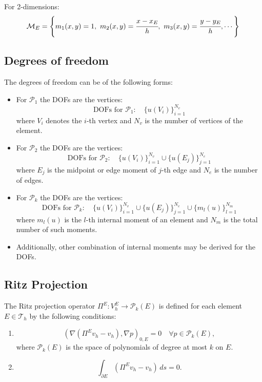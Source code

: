 \documentclass{report}
\begin{document}
For 2-dimensions:
\begin{equation}
    \mathcal{M}_E = \left\{m_1(x,y) = 1,\ m_2(x,y) = \cfrac{x-x_E}{h},\ m_3(x,y) = \cfrac{y-y_E}{h}, \cdots\right\}
\end{equation}



\subsection{Degrees of freedom}
The degrees of freedom can be of the following forms:
\begin{itemize}
    \item For $\mathcal{P}_1$ the DOFs are the vertices:
    $$\text{DOFs for } \mathcal{P}_1: \quad \{ u(V_i) \}_{i=1}^{N_v}$$
    where $V_i$ denotes the $i$-th vertex and $N_v$ is the number of vertices of the element.
    
    \item For $\mathcal{P}_2$ the DOFs are the vertices:
    $$\text{DOFs for } \mathcal{P}_2: \quad \{ u(V_i) \}_{i=1}^{N_v} \cup \{ u(E_j) \}_{j=1}^{N_e}$$
    where $E_j$ is the midpoint or edge moment of $j$-th edge and $N_e$ is the number of edges.
    
    \item For $\mathcal{P}_k$ the DOFs are the vertices:
    $$\text{DOFs for } \mathcal{P}_k: \quad \{ u(V_i) \}_{i=1}^{N_v} \cup \{ u(E_j) \}_{j=1}^{N_e} \cup \{ m_l(u) \}_{l=1}^{N_m}$$
    where $m_l(u)$ is the $l$-th internal moment of an element and $N_m$ is the total number of such moments.

    \item Additionally, other combination of internal moments may be derived for the DOFs.    
\end{itemize}



\subsection{Ritz Projection}
The Ritz projection operator $\Pi^E: V_h^E \rightarrow \mathcal{P}_k(E)$ is defined for each element $E \in \mathcal{T}_h$ by the following conditions:
\begin{enumerate}
    \item
    \[
    (\nabla (\Pi^E v_h - v_h), \nabla p)_{0,E} = 0 \quad \forall p \in \mathcal{P}_k(E),
    \]
    where $\mathcal{P}_k(E)$ is the space of polynomials of degree at most $k$ on $E$.
    
    \item
    \[
    \int_{\partial E} (\Pi^E v_h - v_h) \, ds = 0.
    \]
\end{enumerate}
\end{document}
